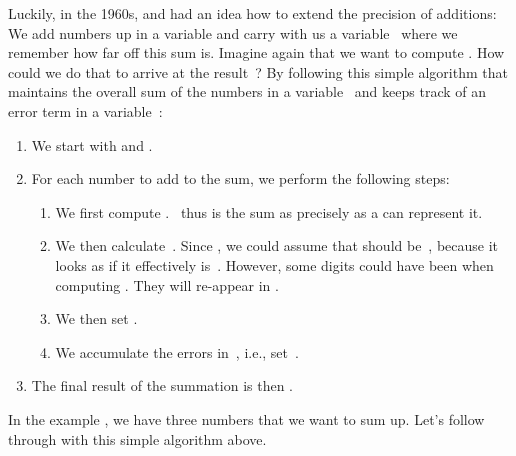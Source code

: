Luckily, in the 1960s, \citeauthor{K1965PFRORTE} and \citeauthor{B1968NSIMA} had an idea how to extend the precision of additions:
We add numbers up in a  variable and carry with us a variable~ where we remember how far off this sum is.
Imagine again that we want to compute .
How could we do that to arrive at the result~?
By following this simple algorithm that maintains the overall sum of the numbers in a variable~ and keeps track of an error term in a variable~:%
%
\begin{enumerate}%
%
\item We start with  and .%
%
\item For each number to add to the sum, we perform the following steps:%
\begin{enumerate}%
%
\item We first compute . %
~thus is the sum as precisely as a  can represent it.
%
\item We then calculate~. %
Since , we could assume that  should be~, because it looks as if it effectively is~. %
However, some digits could have been  when computing .
They will re-appear in .%
%
\item We then set .%
%
\item We accumulate the errors in~, i.e., set~.%
%
\end{enumerate}%
%
\item The final result of the summation is then .
\end{enumerate}%
%
In the example , we have three numbers that we want to sum up.
Let's follow through with this simple algorithm above.%
%
